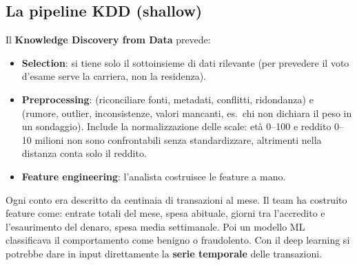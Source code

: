 \subsection{La pipeline KDD (shallow)}
Il \textbf{Knowledge Discovery from Data} prevede:
\begin{center}
\end{center}
\begin{itemize}
  \item \textbf{Selection}: si tiene solo il sottoinsieme di dati rilevante (per prevedere il voto
        d'esame serve la carriera, non la residenza).
  \item \textbf{Preprocessing}:  (riconciliare fonti, metadati, conflitti, ridondanza)
        e  (rumore, outlier, inconsistenze, valori mancanti, es.\ chi non dichiara il peso
        in un sondaggio). Include la normalizzazione delle scale: età 0--100 e reddito 0--10 milioni non sono
        confrontabili senza standardizzare, altrimenti nella distanza conta solo il reddito.
  \item \textbf{Feature engineering}: l'analista costruisce le feature a mano.
\end{itemize}

\begin{esempio}
Ogni conto era descritto da centinaia di transazioni al mese. Il team ha costruito feature come:
entrate totali del mese, spesa abituale, giorni tra l'accredito e l'esaurimento del denaro, spesa
media settimanale. Poi un modello ML classificava il comportamento come benigno o fraudolento.
Con il deep learning si potrebbe dare in input direttamente la \textbf{serie temporale} delle transazioni.
\end{esempio}

